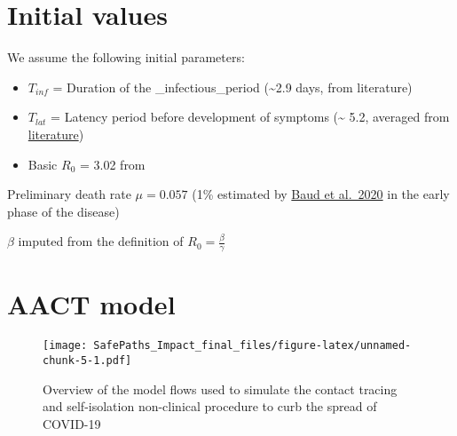 \documentclass[]{article}
\begin{document}
\hypertarget{initial-values}{%
\section{Initial values}\label{initial-values}}

We assume the following initial parameters:

\begin{itemize}
\item
  \(T_{inf}\) = Duration of the \_infectious\_period
  (\textasciitilde{}2.9 days, from literature)
\item
  \(T_{lat}\) = Latency period before development of symptoms
  (\textasciitilde{} 5.2, averaged from
  \href{https://www.eurosurveillance.org/content/10.2807/1560-7917.ES.2020.25.5.2000062}{literature})
\item
  Basic \(R_0\) = 3.02 from
  \href{https://doi.org/10.1016/S2214-109X\%2820\%2930113-3}{}
\end{itemize}

Preliminary death rate \(\mu = 0.057\) (1\% estimated by
\href{https://doi.org/10.1016/S1473-3099\%2820\%2930195-X}{Baud et
al.~2020} in the early phase of the disease)

\(\beta\) imputed from the definition of
\(\displaystyle R_{0}= \frac{\beta}{\gamma}\)

\hypertarget{aact-model}{%
\section{AACT model}\label{aact-model}}

\begin{figure}
\centering
\texttt{[image: SafePaths\_Impact\_final\_files/figure-latex/unnamed-chunk-5-1.pdf]}
\caption{Overview of the model flows used to simulate the contact
tracing and self-isolation non-clinical procedure to curb the spread of
COVID-19}
\end{figure}
\end{document}
